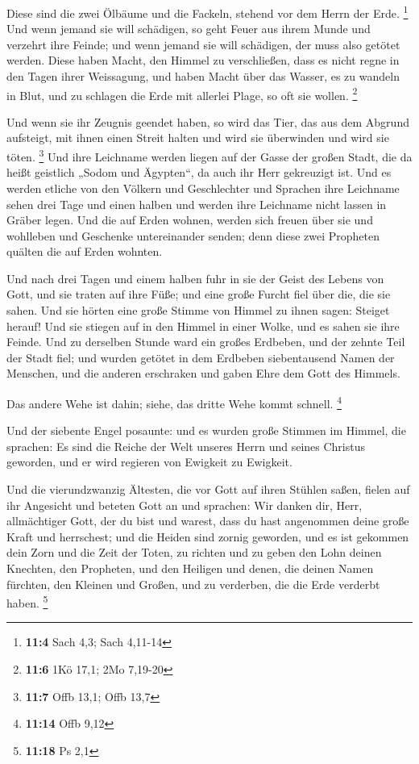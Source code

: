  Diese sind die zwei Ölbäume und die Fackeln, stehend vor
dem Herrn der Erde. \footnote{\textbf{11:4} Sach 4,3; Sach 4,11-14}
 Und wenn jemand sie will schädigen, so geht Feuer aus
ihrem Munde und verzehrt ihre Feinde; und wenn jemand sie will
schädigen, der muss also getötet werden.  Diese haben
Macht, den Himmel zu verschließen, dass es nicht regne in den Tagen
ihrer Weissagung, und haben Macht über das Wasser, es zu wandeln in
Blut, und zu schlagen die Erde mit allerlei Plage, so oft sie wollen.
\footnote{\textbf{11:6} 1Kö 17,1; 2Mo 7,19-20}

 Und wenn sie ihr Zeugnis geendet haben, so wird das Tier,
das aus dem Abgrund aufsteigt, mit ihnen einen Streit halten und wird
sie überwinden und wird sie töten. \footnote{\textbf{11:7} Offb 13,1;
  Offb 13,7}  Und ihre Leichname werden liegen auf der
Gasse der großen Stadt, die da heißt geistlich „Sodom und Ägypten``, da
auch ihr Herr gekreuzigt ist.  Und es werden etliche von
den Völkern und Geschlechter und Sprachen ihre Leichname sehen drei Tage
und einen halben und werden ihre Leichname nicht lassen in Gräber legen.
 Und die auf Erden wohnen, werden sich freuen über sie
und wohlleben und Geschenke untereinander senden; denn diese zwei
Propheten quälten die auf Erden wohnten.

 Und nach drei Tagen und einem halben fuhr in sie der
Geist des Lebens von Gott, und sie traten auf ihre Füße; und eine große
Furcht fiel über die, die sie sahen.  Und sie hörten eine
große Stimme von Himmel zu ihnen sagen: Steiget herauf! Und sie stiegen
auf in den Himmel in einer Wolke, und es sahen sie ihre Feinde.
 Und zu derselben Stunde ward ein großes Erdbeben, und
der zehnte Teil der Stadt fiel; und wurden getötet in dem Erdbeben
siebentausend Namen der Menschen, und die anderen erschraken und gaben
Ehre dem Gott des Himmels.

 Das andere Wehe ist dahin; siehe, das dritte Wehe kommt
schnell. \footnote{\textbf{11:14} Offb 9,12}

 Und der siebente Engel posaunte: und es wurden große
Stimmen im Himmel, die sprachen: Es sind die Reiche der Welt unseres
Herrn und seines Christus geworden, und er wird regieren von Ewigkeit zu
Ewigkeit.

 Und die vierundzwanzig Ältesten, die vor Gott auf ihren
Stühlen saßen, fielen auf ihr Angesicht und beteten Gott an
 und sprachen: Wir danken dir, Herr, allmächtiger Gott,
der du bist und warest, dass du hast angenommen deine große Kraft und
herrschest;  und die Heiden sind zornig geworden, und es
ist gekommen dein Zorn und die Zeit der Toten, zu richten und zu geben
den Lohn deinen Knechten, den Propheten, und den Heiligen und denen, die
deinen Namen fürchten, den Kleinen und Großen, und zu verderben, die die
Erde verderbt haben. \footnote{\textbf{11:18} Ps 2,1}

